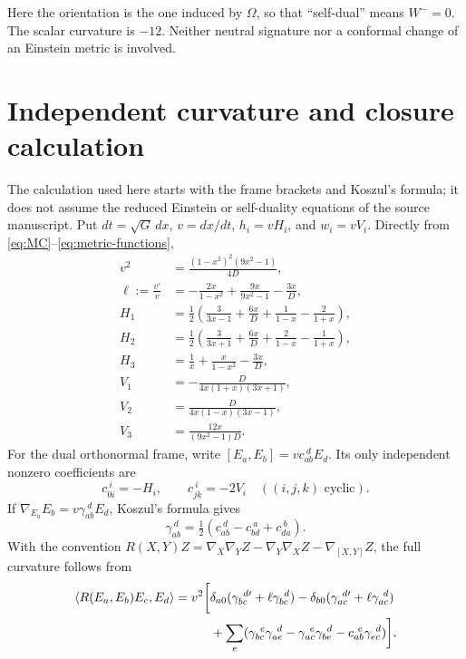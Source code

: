 \documentclass[11pt]{article}
\begin{document}
Here the orientation is the one induced by $\Omega$, so that
``self-dual'' means $W^-=0$. The scalar curvature is $-12$.
Neither neutral signature nor a conformal change of an Einstein metric
is involved.

\section{Independent curvature and closure calculation}

The calculation used here starts with the frame brackets and Koszul's
formula; it does not assume the reduced Einstein or self-duality
equations of the source manuscript. Put $dt=\sqrt G\,dx$, $v=dx/dt$,
$h_i=vH_i$, and $w_i=vV_i$. Directly from
\eqref{eq:MC}--\eqref{eq:metric-functions},
\begin{align*}
 v^2&=\frac{(1-x^2)^2(9x^2-1)}{4D},\\
 \ell:=\frac{v'}v&=-\frac{2x}{1-x^2}+
 \frac{9x}{9x^2-1}-\frac{3x}{D},\\
 H_1&=\frac12\left(\frac3{3x-1}+\frac{6x}{D}
       +\frac1{1-x}-\frac2{1+x}\right),\\
 H_2&=\frac12\left(\frac3{3x+1}+\frac{6x}{D}
       +\frac2{1-x}-\frac1{1+x}\right),\\
 H_3&=\frac1x+\frac{x}{1-x^2}-\frac{3x}{D},\\
 V_1&=-\frac{D}{4x(1+x)(3x+1)},\\
 V_2&=\frac{D}{4x(1-x)(3x-1)},\\
 V_3&=\frac{12x}{(9x^2-1)D}.
\end{align*}
For the dual orthonormal frame, write $[E_a,E_b]=v c_{ab}^{\ d}E_d$.
Its only independent nonzero coefficients are
\[
 c_{0i}^{\ i}=-H_i,\qquad c_{jk}^{\ i}=-2V_i
 \quad ((i,j,k)\text{ cyclic}).
\]
If $\nabla_{E_a}E_b=v\gamma_{ab}^{\ d}E_d$, Koszul's formula gives
\begin{equation}\label{eq:koszul}
 \gamma_{ab}^{\ d}=\tfrac12
 (c_{ab}^{\ d}-c_{bd}^{\ a}+c_{da}^{\ b}).
\end{equation}
With the convention
$R(X,Y)Z=\nabla_X\nabla_YZ-\nabla_Y\nabla_XZ-\nabla_{[X,Y]}Z$,
the full curvature follows from
\begin{align}\label{eq:full-R}
 \langle R(E_a,E_b)E_c,E_d\rangle
 =v^2\bigg[&\delta_{a0}(\gamma_{bc}^{\ d\prime}+\ell\gamma_{bc}^{\ d})
 -\delta_{b0}(\gamma_{ac}^{\ d\prime}+\ell\gamma_{ac}^{\ d})\notag\\
 &+\sum_e(\gamma_{bc}^{\ e}\gamma_{ae}^{\ d}
 -\gamma_{ac}^{\ e}\gamma_{be}^{\ d}-c_{ab}^{\ e}\gamma_{ec}^{\ d})\bigg].
\end{align}
\end{document}
